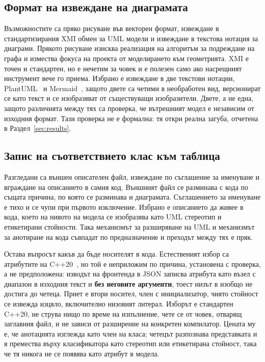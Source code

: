 \subsection{Формат на извеждане на диаграмата}

Възможностите са пряко рисуване във векторен формат, извеждане в стандартизирания XMI
обмен за UML модели и извеждане в текстова нотация за диаграми. Прякото рисуване изисква
реализация на алгоритъм за подреждане на графа и измества фокуса на проекта от
моделирането към геометрията. XMI е точен и стандартен, но е нечетим за човек и е полезен
само ако насрещният инструмент вече го приема. Избрано е извеждане в две текстови
нотации, PlantUML~\cite{plantuml_guide} и Mermaid~\cite{mermaid_docs}, защото двете са
четими в необработен вид, версионират се като текст и се изобразяват от съществуващи
изобразители. Двете, а не една, защото различията между тях са проверка, че вътрешният
модел е независим от изходния формат. Тази проверка не е формална: тя откри реална
загуба, отчетена в Раздел~\ref{sec:results}.

\subsection{Запис на съответствието клас към таблица}

Разгледани са външен описателен файл, извеждане по съглашение за именуване и вграждане на
описанието в самия код. Външният файл се разминава с кода по същата причина, по която се
разминава и диаграмата. Съглашението за именуване е тихо и се чупи при първото изключение.
Избрано е описанието да живее в кода, което на нивото на модела се изобразява като UML
стереотип и етикетирани стойности. Така механизмът за разширяване на UML и механизмът за
анотиране на кода съвпадат по предназначение и преходът между тях е пряк.

Остава въпросът какъв да бъде носителят в кода. Естественият избор са атрибутите на
C++20~\cite{iso_cpp20}, но той е неприложим по причина, установена с проверка, а не
предположена: изводът на фронтенда в JSON записва атрибута като възел с диапазон в
изходния текст и \textbf{без неговите аргументи}, тоест низът в
\code{[[clang::annotate("table=books")]]} изобщо не достига до четеца. Приет е втори
носител,  член с инициализатор, чиято стойност се извежда изцяло,
включително низовият литерал. Изборът е стандартен C++20, не струва нищо по време на
изпълнение, чете се от човек, отварящ заглавния файл, и не зависи от разширение на
конкретен компилатор. Цената му е, че анотацията изглежда като член на класа; четецът
разпознава представката  и я премества върху класификатора като стереотип или
етикетирана стойност, така че тя никога не се появява като атрибут в модела.

